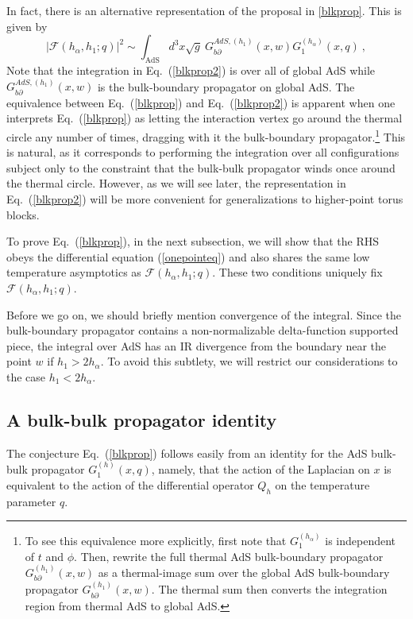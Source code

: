 \documentclass[12pt]{article}
\def\p{\partial}
\begin{document}
In fact, there is an alternative representation of the proposal in \cref{blkprop}. This is given by
\begin{equation}
\label{blkprop2}  |\mathcal{F}(h_{\alpha},h_1;q)|^2 \sim  \int_\text{AdS} d^3x \sqrt{g} ~G_{b\p}^{AdS,(h_1)}(x,w)G_{1}^{(h_\alpha)}(x,q)~,
\end{equation}
Note that the integration in Eq.~(\ref{blkprop2}) is over all of global AdS while $G_{b\p}^{AdS,(h_1)}(x,w)$ is the bulk-boundary propagator on global AdS.
The equivalence between Eq.~(\ref{blkprop}) and Eq.~(\ref{blkprop2}) is apparent when one interprets Eq.~(\ref{blkprop}) as letting the interaction vertex go around the thermal circle any number of times, dragging with it the bulk-boundary propagator.\footnote{To see this equivalence more explicitly,
first note that $G_1^{(h_\alpha)}$ is independent of $t$ and $\phi$. Then, rewrite the full thermal AdS bulk-boundary propagator $G_{b\p}^{(h_1)}(x,w)$ as a thermal-image sum over the global AdS bulk-boundary propagator $G_{b\p}^{ (h_1)}(x,w)$. The thermal sum then converts the integration region from thermal AdS to global AdS.
} This is natural, as it corresponds to performing the integration over all configurations subject only to the constraint that the bulk-bulk propagator winds once around the thermal circle. However, as we will see later, the representation in  Eq.~(\ref{blkprop2}) will be more convenient for generalizations to higher-point torus blocks.

To prove Eq.~(\ref{blkprop}), in the next subsection, we will show that the RHS obeys the differential equation (\ref{onepointeq}) and also shares the same low temperature asymptotics as $\mathcal{F}(h_{\alpha},h_1;q)$. These two conditions uniquely fix $\mathcal{F}(h_{\alpha},h_1;q)$.

Before we go on, we should briefly mention convergence of the integral. Since the bulk-boundary propagator contains a non-normalizable delta-function supported piece, the integral over AdS has an IR divergence from the boundary near the point $w$ if $h_1>2h_\alpha$. To avoid this subtlety, we will restrict our considerations to the case $h_1<2h_\alpha$.

\subsection{A bulk-bulk propagator identity}

The conjecture Eq.~(\ref{blkprop}) follows easily from an identity for the AdS bulk-bulk propagator $G_1^{(h)}(x,q)$, namely, that the action of the Laplacian on $x$ is equivalent to the action of the differential operator $Q_h$ on the temperature parameter $q$.
\end{document}
